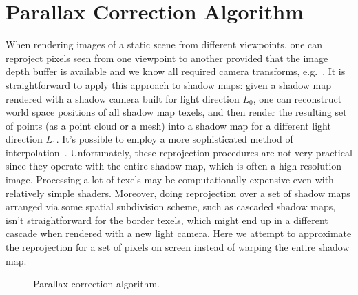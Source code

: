 \section{Parallax Correction Algorithm}

When rendering images of a static scene from different viewpoints, one 
can reproject pixels seen from one viewpoint to another provided that 
the image depth buffer is available and we know all required camera transforms,
e.g.~\cite{Reprojection}. It is straightforward to apply this approach to shadow
maps: given a shadow map rendered with a shadow camera built for light direction
$L_0$, one can reconstruct world space positions of all shadow map texels, and
then render the resulting set of points (as a point cloud or a mesh) into a shadow
map for a different light direction $L_1$. It's possible to employ a more 
sophisticated method of interpolation~\cite{Reprojection2}.
Unfortunately, these reprojection procedures are not very practical 
since they operate with the entire shadow map, which is often a
high-resolution image. Processing a lot of texels may be computationally expensive
even with relatively simple shaders. Moreover, doing reprojection
over a set of shadow maps arranged via some spatial subdivision scheme, such as cascaded shadow 
maps, isn't straightforward for the border texels, which might end up in 
a different cascade when rendered with a new light camera. Here
we attempt to approximate the reprojection for a set of pixels on screen instead 
of warping the entire shadow map.

\begin{figure}[t]
\hfill
{}
\caption{\small Parallax correction algorithm.}
\label{Fig:PCSM}
\end{figure}

